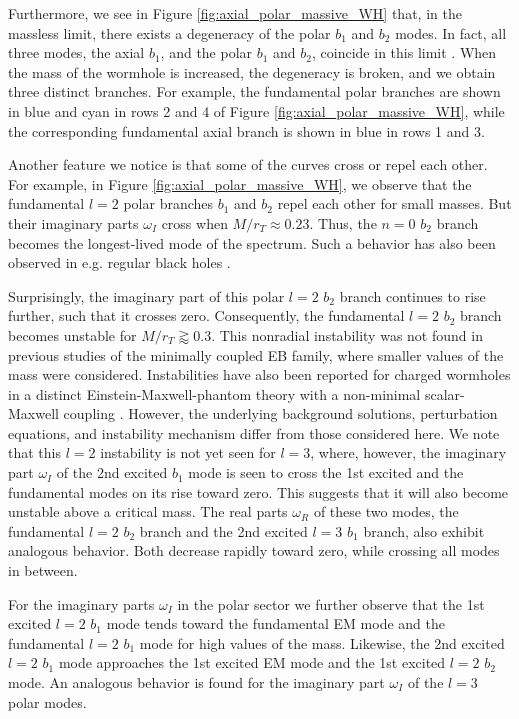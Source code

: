\documentclass[11pt,a4paper]{article}
\begin{document}
Furthermore, we see in Figure \ref{fig:axial_polar_massive_WH} that, in the massless limit, there exists a degeneracy of the polar $b_1$ and $b_2$ modes. 
In fact, all three modes, the axial $b_1$, and the polar $b_1$ and $b_2$, coincide in this limit \cite{Azad:2022qqn}. 
When the mass of the wormhole is increased, the degeneracy is broken, and we obtain three distinct branches.
For example, the fundamental polar branches are shown in blue and cyan in rows 2 and 4 of Figure \ref{fig:axial_polar_massive_WH}, while the corresponding fundamental axial branch is shown in blue in rows 1 and 3.

Another feature we notice is that some of the curves cross or repel each other. 
For example, in Figure \ref{fig:axial_polar_massive_WH}, we observe that the fundamental $l=2$ polar branches $b_1$ and $b_2$ repel each other for small masses.
But their imaginary parts $\omega_I$ cross when $M/r_T\approx0.23$. 
Thus, the $n=0$ $b_2$ branch becomes the longest-lived mode of the spectrum. 
Such a behavior has also been observed in e.g. regular black holes \cite{Khoo:2025qjc}.

Surprisingly, the imaginary part of this polar $l=2$ $b_2$ branch continues to rise further, such that it crosses zero.
Consequently, the fundamental $l=2$ $b_2$ branch becomes unstable for $M/r_T\gtrapprox 0.3$.
This nonradial instability was not found in previous studies of the minimally coupled EB family, where smaller values of the mass were considered. 
Instabilities have also been reported for charged wormholes in a distinct Einstein-Maxwell-phantom theory with a non-minimal scalar-Maxwell coupling \cite{Wu:2025wlz}.
However, the underlying background solutions, perturbation equations, and instability mechanism differ from those considered here.
We note that this $l=2$ instability is not yet seen for $l=3$, where, however, the imaginary part $\omega_I$ of the 2nd excited $b_1$ mode is seen to cross the 1st excited and the fundamental modes on its rise toward zero.
This suggests that it will also become unstable above a critical mass.
%
The real parts $\omega_R$ of these two modes, the fundamental $l=2$ $b_2$ branch and the 2nd excited $l=3$ $b_1$ branch, also exhibit analogous behavior.
Both decrease rapidly toward zero, while crossing all modes in between.

For the imaginary parts $\omega_I$ in the polar sector we further observe that the 1st excited $l=2$ $b_1$ mode tends toward the fundamental EM mode and the fundamental $l=2$ $b_1$ mode for high values of the mass.  
Likewise, the 2nd excited $l=2$ $b_1$ mode approaches the 1st excited EM mode and the 1st excited $l=2$ $b_2$ mode.
An analogous behavior is found for the imaginary part $\omega_I$ of the $l=3$ polar modes. 
\end{document}
